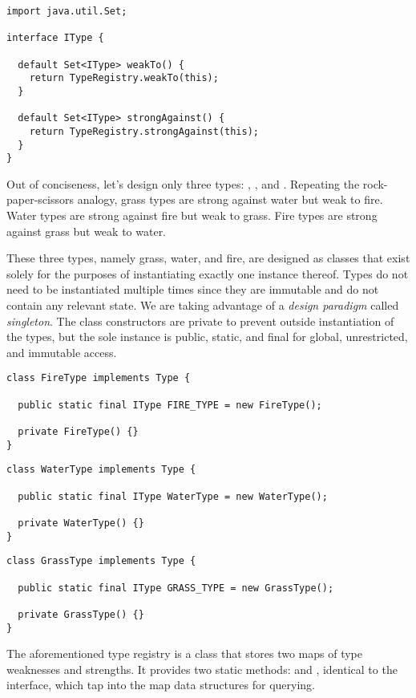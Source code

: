 \begin{lstlisting}[language=MyJava]
import java.util.Set;

interface IType {

  default Set<IType> weakTo() {
    return TypeRegistry.weakTo(this);
  }

  default Set<IType> strongAgainst() {
    return TypeRegistry.strongAgainst(this);
  }
}
\end{lstlisting}

Out of conciseness, let's design only three types: , , and . Repeating the rock-paper-scissors analogy, grass types are strong against water but weak to fire. Water types are strong against fire but weak to grass. Fire types are strong against grass but weak to water. 

These three types, namely grass, water, and fire, are designed as classes that exist solely for the purposes of instantiating exactly one instance thereof. Types do not need to be instantiated multiple times since they are immutable and do not contain any relevant state. We are taking advantage of a \emph{design paradigm} called \emph{singleton}. The class constructors are private to prevent outside instantiation of the types, but the sole instance is public, static, and final for global, unrestricted, and immutable access.

\begin{lstlisting}[language=MyJava]
class FireType implements Type {

  public static final IType FIRE_TYPE = new FireType();

  private FireType() {}
}
\end{lstlisting}

\begin{lstlisting}[language=MyJava]
class WaterType implements Type {

  public static final IType WaterType = new WaterType();

  private WaterType() {}
}
\end{lstlisting}

\begin{lstlisting}[language=MyJava]
class GrassType implements Type {

  public static final IType GRASS_TYPE = new GrassType();

  private GrassType() {}
}
\end{lstlisting}

The aforementioned type registry is a class that stores two maps of type weaknesses and strengths. It provides two static methods:  and , identical to the  interface, which tap into the map data structures for querying.

